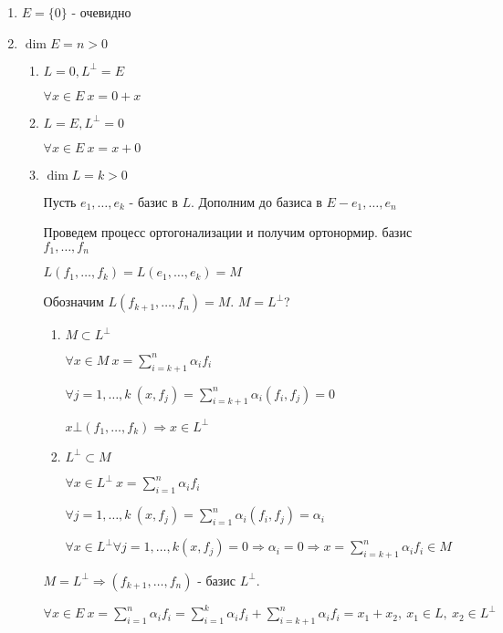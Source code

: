 \begin{enumerate}
 \item $E = \{0\}$ - очевидно
 \item $\dim E = n > 0$
       \begin{enumerate}
        \item $L = 0, L^\bot = E$
        
	      $\forall x \in E ~ x = 0 + x$
	\item $L = E, L^\bot = 0$
        
	      $\forall x \in E ~ x = x + 0$
	\item $\dim L = k > 0$
	
	      Пусть $e_1,\ldots,e_k$ - базис в $L$.
	      Дополним до базиса в $E - e_1,\ldots,e_n$
	      
	      Проведем процесс ортогонализации и получим ортонормир. базис $f_1,\ldots, f_n$
	      
	      $L(f_1,\ldots,f_k) = L(e_1,\ldots,e_k) = M$
	      
	      Обозначим $L(f_{k+1},\ldots,f_n) = M$. $M = L^\bot$?
	      
	      \begin{enumerate}
	       \item $M\subset L^\bot$
	       
		     $\forall x \in M ~ x = \sum_{i=k+1}^n \alpha_i f_i$
		     
		     $\forall j = 1,\ldots,k ~ (x,f_j) = \sum_{i=k+1}^n \alpha_i (f_i,f_j) = 0$
		     
		     $x \bot (f_1,\ldots,f_k) \Rightarrow x \in L^\bot$
		     
	       \item $L^\bot \subset M$
		     
		     $\forall x \in L^\bot ~ x = \sum_{i=1}^n \alpha_i f_i$
		     
		     $\forall j = 1,\ldots,k ~ (x,f_j) = \sum_{i=1}^n \alpha_i (f_i,f_j) = \alpha_i$
		     
		     $\forall x \in L^\bot \forall j = 1,\ldots,k (x,f_j) = 0 \Rightarrow \alpha_i = 0 \Rightarrow x = \sum_{i=k+1}^n \alpha_i f_i \in M$
	      \end{enumerate}
	      $M = L^\bot \Rightarrow (f_{k+1},\ldots,f_n)$ - базис $L^\bot$.
	      
	      $\forall x \in E ~ x = \sum_{i=1}^n \alpha_i f_i = \sum_{i=1}^k \alpha_i f_i + \sum_{i=k+1}^n \alpha_i f_i = x_1 + x_2, ~ x_1 \in L, ~ x_2 \in L^\bot$
	\end{enumerate}

\end{enumerate}

